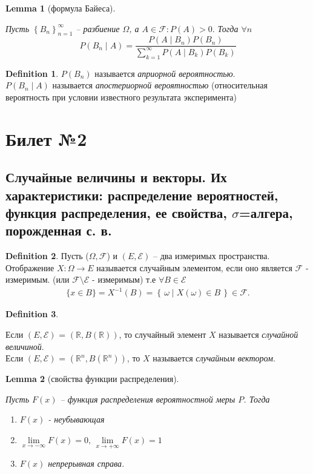 \documentclass[a4paper]{article}
\theoremstyle{plain}
\newtheorem{lem}{Lemma}
\theoremstyle{remark}
\theoremstyle{definition}
\newtheorem{definition}{Definition}
\newcommand{\setR}{\mathbb{R}}
\newcommand{\setRn}{\mathbb{R}^n}
\newcommand{\setF}{\mathcal{F}}
\newcommand{\braces}[1]{\left\{ #1 \right\}} %
\newcommand{\condset}[2]{\braces{\, #1 \mid #2 \,}} %
\begin{document}
\begin{lem}[формула Байеса]~

	Пусть $\braces{B_n}_{n = 1}^{\infty}$ -- разбиение $\Omega$, а $A \in \setF : P(A) > 0.$ Тогда $\forall n$
	\begin{equation*}
		P(B_n \mid A) = \frac{P(A \mid B_n) P(B_n)}{\sum_{k = 1}^{\infty} P(A \mid B_k) P(B_k)}
	\end{equation*}
\end{lem}

\begin{definition}
	$P(B_n)$ называется \emph{априорной вероятностью}.\\
	$P(B_n \mid A)$ называется \emph{апостериорной вероятностью} (относительная вероятность при условии известного результата эксперимента)
\end{definition}

\newpage
\section{Билет №2}
\subsection{Случайные величины и векторы. Их характеристики: распределение вероятностей, функция распределения, ее свойства, $\sigma$=алгера, порожденная с. в.}
\begin{definition}
	Пусть ($\Omega, \setF$) и $(E, \mathcal{E})$ -- два измеримых пространства. 
  Отображение $X\colon \Omega \to E$ называется случайным элементом,
   если оно является $\setF$ - измеримым. (или $\setF \setminus \mathcal{E}$ - измеримым) 
   т.е $\forall B \in \mathcal{E}$
  \begin{align*}
    \{ x \in B \} = X^{-1}(B) = \condset{\omega}{X(\omega) \in B} \in \setF.
  \end{align*}
\end{definition}

\begin{definition}~

  Если $(E, \mathcal{E})$ = $(\setR, B(\setR))$, то случайный элемент $X$ 
  называется \emph{случайной величиной}.\\

  Если $(E, \mathcal{E})$ = $(\setRn, B(\setRn))$, то $X$ называется \emph{случайным вектором}.\\
\end{definition}

\begin{lem}[свойства функции распределения]~

	Пусть $F(x)$ -- функция распределения вероятностной меры $P$. Тогда
	\begin{enumerate}
		\item 
			$F(x)$ - неубывающая

		\item 
			$\lim\limits_{x \rightarrow -\infty} F(x) = 0, \, 
			\lim\limits_{x \rightarrow +\infty} F(x) = 1$

		\item 
			$F(x)$ непрерывная справа.
	\end{enumerate}
\end{lem}
\end{document}
